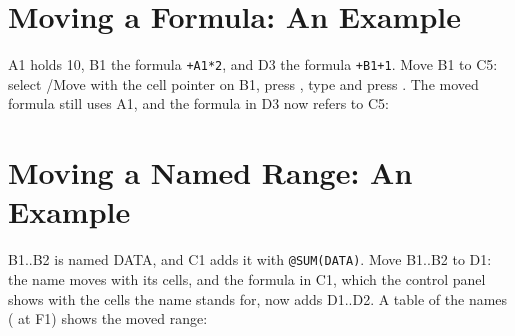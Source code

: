 \section{Moving a Formula: An Example}
A1 holds 10, B1 the formula \texttt{+A1*2}, and D3 the formula
\texttt{+B1+1}.  Move B1 to C5: select /Move with the cell pointer on B1,
press , type  and press .  The moved
formula still uses A1, and the formula in D3 now refers to C5:


\section{Moving a Named Range: An Example}
B1..B2 is named DATA, and C1 adds it with \texttt{@SUM(DATA)}.  Move
B1..B2 to D1: the name moves with its cells, and the formula in C1, which
the control panel shows with the cells the name stands for, now adds
D1..D2.  A table of the names ( at F1) shows
the moved range:

